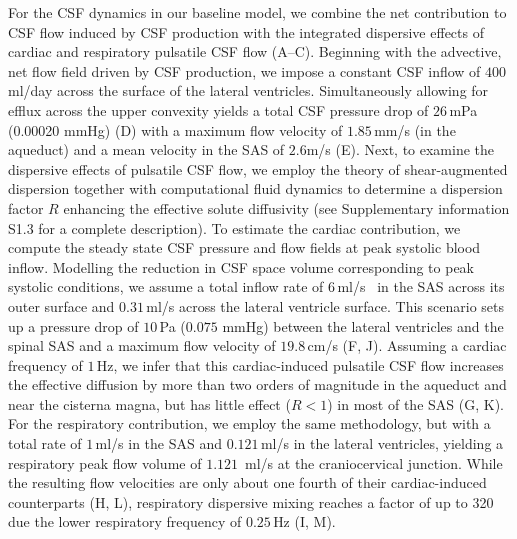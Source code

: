 \documentclass[fleqn,10pt]{wlscirep}
\begin{document}
For the CSF dynamics in our baseline model, we combine the net
contribution to CSF flow induced by CSF production with the integrated
dispersive effects of cardiac and respiratory pulsatile CSF flow
(A--C). Beginning with the advective, net flow field driven by 
CSF production, we impose a constant CSF inflow of $400\,$ml/day across the surface
of the lateral ventricles. Simultaneously allowing for efflux across the upper 
convexity yields a total CSF pressure drop of $26\,$mPa (0.00020 mmHg) (D) with a
maximum flow velocity of $1.85\,$mm/s (in the aqueduct) and a mean
velocity in the SAS of $2.6$\textmu m/s (E). Next, to examine the
dispersive effects of pulsatile CSF flow, we employ the theory of
shear-augmented dispersion together with computational fluid dynamics
to determine a dispersion factor $R$ enhancing the effective solute
diffusivity (see Supplementary information S1.3 for a complete description). 
To estimate the cardiac contribution, we compute the steady state
CSF pressure and flow fields at peak systolic blood inflow.
Modelling the reduction in CSF space volume corresponding to peak systolic
conditions, we assume a total inflow rate of $6\,$ml/s~\cite{baledent2014imaging, causemann2022human}
in the SAS across its outer surface and $0.31\,$ml/s 
across the lateral ventricle surface\cite{vinje2019respiratory}. 
This scenario sets up a pressure
drop of $10\,$Pa ($0.075$ mmHg) between the lateral ventricles and the
spinal SAS and a maximum flow velocity of $19.8\,$cm/s
(F, J). Assuming a cardiac frequency of $1\,$Hz, we
infer that this cardiac-induced pulsatile CSF flow increases the
effective diffusion by more than two orders of magnitude in the
aqueduct and near the cisterna magna, but has little effect ($R <
1$) in most of the SAS (G, K). For the respiratory
contribution, we employ the same methodology, but with a total rate of
$1\,$ml/s \cite{gutierrez2022effect} in the SAS and $0.121\,$ml/s
\cite{liu2024using} in the lateral ventricles, yielding a respiratory
peak flow volume of $1.121\,$ ml/s at the craniocervical
junction. While the resulting flow velocities are only about one
fourth of their cardiac-induced counterparts (H, L),
respiratory dispersive mixing reaches a factor of up to 320 due the
lower respiratory frequency of $0.25\,$Hz (I, M).
\end{document}

